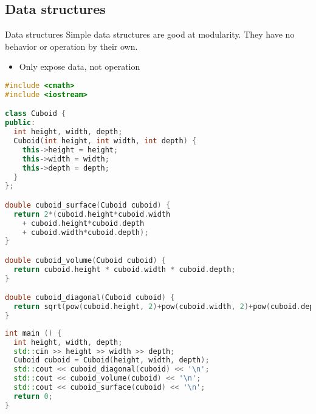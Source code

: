\documentclass{beamer}
\begin{document}
\subsection{Data structures}
\begin{frame}{Data structures}
  Simple data structures are good at modularity. They have no behavior or operation by their own.
  \begin{itemize}
    \item Only expose data, not operation
  \end{itemize}
\end{frame}
\begin{frame}[fragile]
  \begin{lstlisting}[language=C++]
#include <cmath>
#include <iostream>

class Cuboid {
public:
  int height, width, depth;
  Cuboid(int height, int width, int depth) {
    this->height = height;
    this->width = width;
    this->depth = depth;
  }
};

double cuboid_surface(Cuboid cuboid) {
  return 2*(cuboid.height*cuboid.width 
    + cuboid.height*cuboid.depth 
    + cuboid.width*cuboid.depth);
}

double cuboid_volume(Cuboid cuboid) {
  return cuboid.height * cuboid.width * cuboid.depth;
}

double cuboid_diagonal(Cuboid cuboid) {
  return sqrt(pow(cuboid.height, 2)+pow(cuboid.width, 2)+pow(cuboid.depth, 2));
}

 \end{lstlisting}
\end{frame}
\begin{frame}[fragile]
  \begin{lstlisting}[language=C++]
int main () {
  int height, width, depth;
  std::cin >> height >> width >> depth;
  Cuboid cuboid = Cuboid(height, width, depth);
  std::cout << cuboid_diagonal(cuboid) << '\n';
  std::cout << cuboid_volume(cuboid) << '\n';
  std::cout << cuboid_surface(cuboid) << '\n';
  return 0;
} \end{lstlisting}
\end{frame}
\end{document}
